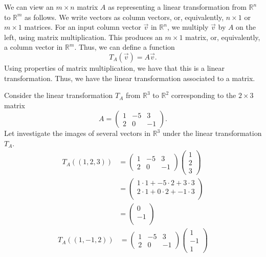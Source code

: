 \documentclass{ximera}
\begin{document}
We can view an $m\times n$ matrix $A$ as representing a linear transformation from $\mathbb{R}^n$ to $\mathbb{R}^m$ as follows. We write vectors as column vectors, or, equivalently, $n\times 1$ or $m\times 1$ matrices. For an input column vector $\vec{v}$ in $\mathbb{R}^n$, we multiply $\vec{v}$ by $A$ on the left, using matrix multiplication. This produces an $m\times 1$ matrix, or, equivalently, a column vector in $\mathbb{R}^m$. Thus, we can define a function
\[
T_A(\vec{v}) = A\vec{v}.
\]
Using properties of matrix multiplication, we have that this is a linear transformation. Thus, we have the linear transformation associated to a matrix.

\begin{example}
Consider the linear transformation $T_A$ from $\mathbb{R}^3$ to $\mathbb{R}^2$ corresponding to the $2\times 3$ matrix
\[
A = \left(\begin{array}{ccc}
1 & -5 & 3\\
2 & 0 & -1
\end{array}\right).
\]
Let investigate the images of several vectors in $\mathbb{R}^3$ under the linear transformation $T_A$.
\begin{align*}
T_A((1,2,3)) &= \left(\begin{array}{ccc}
1 & -5 & 3\\
2 & 0 & -1
\end{array}\right)\left(\begin{array}{c} 1\\2\\3\end{array}\right)\\
& = \left(\begin{array}{c} 
1\cdot 1 + -5\cdot 2 + 3\cdot 3\\
2\cdot 1 + 0\cdot 2 + -1\cdot 3\\
\end{array}\right)\\
& = \left(\begin{array}{c} 
0\\
-1\\
\end{array}\right)
\end{align*}
\begin{align*}
T_A((1,-1,2)) &= \left(\begin{array}{ccc}
1 & -5 & 3\\
2 & 0 & -1
\end{array}\right)\left(\begin{array}{c} 1\\-1\\1\end{array}\right)\\

\end{align*}
\end{example}
\end{document}
